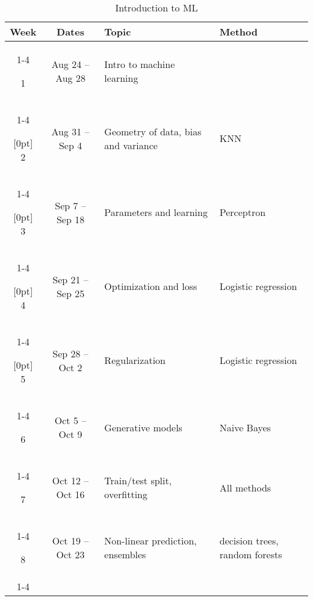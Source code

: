 \documentclass[10pt]{memoir}
\begin{document}
\begin{table}[htb!]
\centering
\begin{tabular}{ccll}
     \textbf{Week} & \textbf{Dates} & \textbf{Topic} & \textbf{Method}   \\
    \cmidrule[.1em](lr){1-4}
    
     1 & Aug 24 -- Aug 28 & Intro to machine learning &  \\
    \cmidrule[.1em](lr){1-4} 
 
     \multirow{1}{*}[0pt]{\textit{}} 
         2 & Aug 31 -- Sep 4 & Geometry of data, bias and variance & KNN  \\ 
        \cmidrule[.1em](lr){1-4}
        
    \multirow{1}{*}[0pt]{\textit{}} 
         3 & Sep 7 -- Sep 18 & Parameters and learning & Perceptron   \\ \cmidrule[.1em](lr){1-4}

    \multirow{1}{*}[0pt]{} 
         4 & Sep 21 -- Sep 25 & Optimization and loss & Logistic regression \\   \cmidrule[.1em](lr){1-4}    

   \multirow{1}{*}[0pt]{} %
         5 & Sep 28 -- Oct 2 &  Regularization & Logistic regression  \\ \cmidrule[.1em](lr){1-4}             

     6 & Oct 5 -- Oct 9 & Generative models & Naive Bayes \\
    \cmidrule[.1em](lr){1-4} 

    7 & Oct 12 -- Oct 16 &  Train/test split, overfitting  &  All methods  \\
    \cmidrule[.1em](lr){1-4}

   8  &  Oct 19 -- Oct 23 & Non-linear prediction, ensembles  & decision trees, random forests \\
    \cmidrule[.1em](lr){1-4}

\end{tabular}\\
\caption{Introduction to ML}
\end{table}
\end{document}
